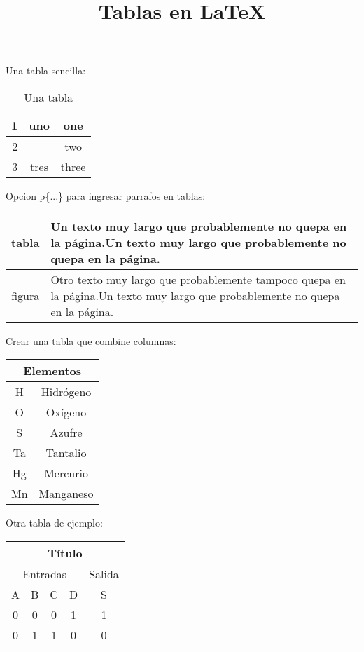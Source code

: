 \documentclass{article}
\title{Tablas en \LaTeX}
\date{}
\begin{document}
\maketitle
Una tabla sencilla:

\begin{table}[h]
\centering
\caption{Una tabla}
\begin{tabular}{|r||c|c|}
	\hline
	1	&	uno		&	one	\\	\hline
	2	&			&	two	\\	
	3	&	tres	&	three\\	\hline \hline
\end{tabular}
\end{table}

Opcion p\{...\} para ingresar parrafos en tablas:
\begin{table}[h]
	\begin{tabular}{c|p{300pt}}
		tabla	&	Un texto muy largo que probablemente no quepa en la página.Un texto muy largo que probablemente no quepa en la página.\\ \hline
		figura	&	Otro texto muy largo que probablemente tampoco quepa en la página.Un texto muy largo que probablemente no quepa en la página.\\
	\end{tabular}
\end{table}

Crear una tabla que combine columnas:
\begin{table}[h]
	\begin{tabular}{|c|c|}
		\hline
		\multicolumn{2}{|c|}{\textbf{Elementos}} \\ \hline
		H	&	Hidrógeno	\\	\hline
		O	&	Oxígeno		\\	\hline
		S	&	Azufre		\\	\hline
		Ta	&	Tantalio	\\	\hline
		Hg	&	Mercurio	\\	\hline
		Mn	&	Manganeso	\\	\hline
	\end{tabular}
\end{table}

\newpage
Otra tabla de ejemplo:
\begin{table}[h]
	\begin{tabular}{|c|c|c|c|c|}
		\hline
		\multicolumn{5}{|c|}{\textbf{Título}}		\\ \hline
		\multicolumn{4}{|c|}{Entradas}	&	Salida	\\ \hline
		A	&	B	&	C	&	D		&	S		\\ \hline
		0	&	0	&	0	&	1		&	1		\\ \hline
		0	&	1	&	1	&	0		&	0		\\ \hline
	\end{tabular}
\end{table}
\end{document}
